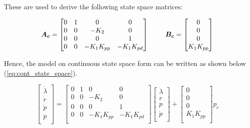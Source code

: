\documentclass[a4paper, 12pt]{article}\usepackage[utf8]{inputenc}
\begin{document}
These are used to derive the following state space matrices:

\begin{equation}
     \boldsymbol{A_c}=\begin{bmatrix}
    0 & 1 & 0 & 0\\
    0 & 0 & -K_2 & 0\\
    0 & 0 & 0 & 1\\
    0 & 0 & -K_1K_{pp} & -K_{1}K_{pd}\\
    \end{bmatrix}
    \begin{tabular}{cc}
         &  \\
         & 
    \end{tabular}
    \boldsymbol{B_c}=\begin{bmatrix}
    0\\
    0\\
    0\\
    K_1K_{pp}\\
    \end{bmatrix} 
\end{equation}

Hence, the model on continuous state space form can be written as shown below (\ref{eq:cont_state_space}). 

\begin{equation} \label{eq:cont_state_space}
    \begin{bmatrix}
        \dot{\lambda}\\
        \dot{r}\\
        \dot{p}\\
        \ddot{p}\\
    \end{bmatrix}
    = \begin{bmatrix}
    0 & 1 & 0 & 0\\
    0 & 0 & -K_2 & 0\\
    0 & 0 & 0 & 1\\
    0 & 0 & -K_1K_{pp} & -K_{1}K_{pd}\\
    \end{bmatrix}
    \begin{bmatrix}
        \lambda\\
        r\\
        p\\
        \dot{p}\\
    \end{bmatrix}
    + \begin{bmatrix}
    0\\
    0\\
    0\\
    K_1K_{pp}\\
    \end{bmatrix} p_c
\end{equation}
\end{document}
